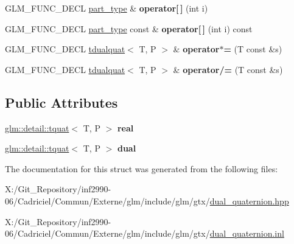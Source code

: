 \begin{DoxyCompactItemize}
\item 
\hypertarget{structglm_1_1detail_1_1tdualquat_a6c97baca66efdfefa2e127d4868ce22c}{G\-L\-M\-\_\-\-F\-U\-N\-C\-\_\-\-D\-E\-C\-L \hyperlink{structglm_1_1detail_1_1tquat}{part\-\_\-type} \& {\bfseries operator\mbox{[}$\,$\mbox{]}} (int i)}\label{structglm_1_1detail_1_1tdualquat_a6c97baca66efdfefa2e127d4868ce22c}

\item 
\hypertarget{structglm_1_1detail_1_1tdualquat_a7a646a4f41587c5a8ba9ebb728b64b24}{G\-L\-M\-\_\-\-F\-U\-N\-C\-\_\-\-D\-E\-C\-L \hyperlink{structglm_1_1detail_1_1tquat}{part\-\_\-type} const \& {\bfseries operator\mbox{[}$\,$\mbox{]}} (int i) const }\label{structglm_1_1detail_1_1tdualquat_a7a646a4f41587c5a8ba9ebb728b64b24}

\item 
\hypertarget{structglm_1_1detail_1_1tdualquat_ab958553d52f05997218dc32ff66308ff}{G\-L\-M\-\_\-\-F\-U\-N\-C\-\_\-\-D\-E\-C\-L \hyperlink{structglm_1_1detail_1_1tdualquat}{tdualquat}$<$ T, P $>$ \& {\bfseries operator$\ast$=} (T const \&s)}\label{structglm_1_1detail_1_1tdualquat_ab958553d52f05997218dc32ff66308ff}

\item 
\hypertarget{structglm_1_1detail_1_1tdualquat_a16b0b3f78c28d7cf982761d66dada98d}{G\-L\-M\-\_\-\-F\-U\-N\-C\-\_\-\-D\-E\-C\-L \hyperlink{structglm_1_1detail_1_1tdualquat}{tdualquat}$<$ T, P $>$ \& {\bfseries operator/=} (T const \&s)}\label{structglm_1_1detail_1_1tdualquat_a16b0b3f78c28d7cf982761d66dada98d}

\end{DoxyCompactItemize}
\subsection*{Public Attributes}
\begin{DoxyCompactItemize}
\item 
\hypertarget{structglm_1_1detail_1_1tdualquat_abebb177d1dca2b170fe7d01e9970eb37}{\hyperlink{structglm_1_1detail_1_1tquat}{glm\-::detail\-::tquat}$<$ T, P $>$ {\bfseries real}}\label{structglm_1_1detail_1_1tdualquat_abebb177d1dca2b170fe7d01e9970eb37}

\item 
\hypertarget{structglm_1_1detail_1_1tdualquat_a6d739e4771a6244cc15562c2ecda7fdc}{\hyperlink{structglm_1_1detail_1_1tquat}{glm\-::detail\-::tquat}$<$ T, P $>$ {\bfseries dual}}\label{structglm_1_1detail_1_1tdualquat_a6d739e4771a6244cc15562c2ecda7fdc}

\end{DoxyCompactItemize}


The documentation for this struct was generated from the following files\-:\begin{DoxyCompactItemize}
\item 
X\-:/\-Git\-\_\-\-Repository/inf2990-\/06/\-Cadriciel/\-Commun/\-Externe/glm/include/glm/gtx/\hyperlink{dual__quaternion_8hpp}{dual\-\_\-quaternion.\-hpp}\item 
X\-:/\-Git\-\_\-\-Repository/inf2990-\/06/\-Cadriciel/\-Commun/\-Externe/glm/include/glm/gtx/\hyperlink{dual__quaternion_8inl}{dual\-\_\-quaternion.\-inl}\end{DoxyCompactItemize}
